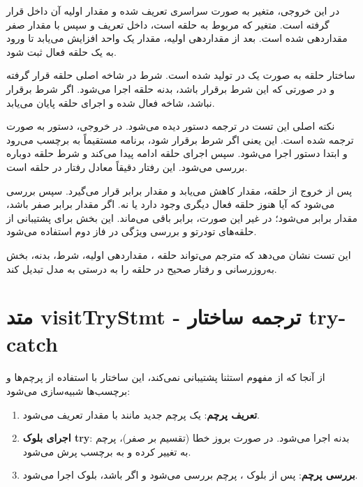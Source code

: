 \documentclass[12pt]{report}
\begin{document}
	
	در این خروجی، متغیر  به صورت سراسری تعریف شده و مقدار اولیه آن داخل  قرار گرفته است. 
	متغیر  که مربوط به حلقه  است، داخل  تعریف و سپس با مقدار صفر مقداردهی شده است. 
	بعد از مقداردهی اولیه، مقدار  یک واحد افزایش می‌یابد تا ورود به یک حلقه فعال ثبت شود.
	
	ساختار حلقه  به صورت یک  در  تولید شده است. 
	شرط  در شاخه اصلی حلقه قرار گرفته و در صورتی که این شرط برقرار باشد، بدنه حلقه اجرا می‌شود. 
	اگر شرط برقرار نباشد، شاخه  فعال شده و اجرای حلقه پایان می‌یابد.
	
	نکته اصلی این تست در ترجمه دستور  دیده می‌شود. 
	در خروجی، دستور  به صورت  ترجمه شده است. 
	این یعنی اگر شرط  برقرار شود، برنامه مستقیماً به برچسب  می‌رود و ابتدا دستور  اجرا می‌شود. 
	سپس اجرای حلقه ادامه پیدا می‌کند و شرط حلقه دوباره بررسی می‌شود. 
	این رفتار دقیقاً معادل رفتار  در حلقه  است.
	
	پس از خروج از حلقه، مقدار  کاهش می‌یابد و مقدار  برابر  قرار می‌گیرد. 
	سپس بررسی می‌شود که آیا هنوز حلقه فعال دیگری وجود دارد یا نه. 
	اگر مقدار  برابر صفر باشد، مقدار  برابر  می‌شود؛ در غیر این صورت،  برابر  باقی می‌ماند. 
	این بخش برای پشتیبانی از حلقه‌های تودرتو و بررسی ویژگی  در فاز دوم استفاده می‌شود.
	
	این تست نشان می‌دهد که مترجم می‌تواند حلقه ، مقداردهی اولیه، شرط، بدنه، بخش به‌روزرسانی و رفتار صحیح  در حلقه  را به درستی به مدل  تبدیل کند.
	
	\section{متد visitTryStmt - ترجمه ساختار try-catch}
	
	از آنجا که  از مفهوم استثنا پشتیبانی نمی‌کند، این ساختار با استفاده از پرچم‌ها و برچسب‌ها شبیه‌سازی می‌شود:
	
	
	\begin{enumerate}
		\item \textbf{تعریف پرچم}: یک پرچم جدید مانند  با مقدار  تعریف می‌شود.
		\item \textbf{اجرای بلوک try}: بدنه  اجرا می‌شود. در صورت بروز خطا (تقسیم بر صفر)، پرچم به  تغییر کرده و به برچسب  پرش می‌شود.
		\item \textbf{بررسی پرچم}: پس از بلوک ، پرچم بررسی می‌شود و اگر  باشد، بلوک  اجرا می‌شود.
	\end{enumerate}
	
\end{document}

